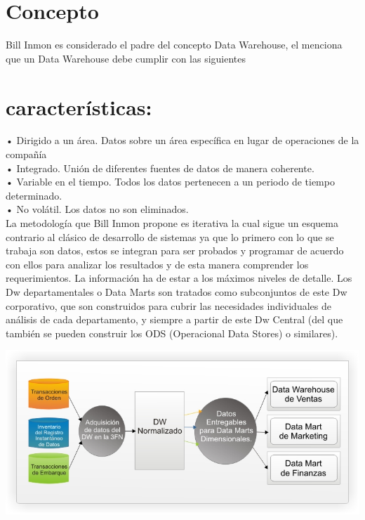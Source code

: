 \section{Concepto}
Bill Inmon es considerado el padre del concepto Data Warehouse, el menciona que un Data Warehouse debe cumplir con las siguientes \section{características:}
•	Dirigido a un área. Datos sobre un área específica en lugar de operaciones de la compañía\\
•	Integrado. Unión de diferentes fuentes de datos de manera coherente.\\
•	Variable en el tiempo. Todos los datos pertenecen a un periodo de tiempo determinado.\\
•	No volátil. Los datos no son eliminados.\\
La metodología que Bill Inmon propone es iterativa la cual sigue un esquema contrario al clásico de desarrollo de sistemas ya que lo primero con lo que se trabaja son datos, estos se integran para ser probados y programar de acuerdo con ellos para analizar los resultados y de esta manera comprender los requerimientos. 
La información ha de estar a los máximos niveles de detalle. Los Dw departamentales o Data Marts son tratados como subconjuntos de este Dw corporativo, que son construidos para cubrir las necesidades individuales de análisis de cada departamento, y siempre a partir de este Dw Central (del que también se pueden construir los ODS (Operacional Data Stores) o similares).\\
\begin{center}
\includegraphics[width=16cm]{./Imagenes/image003}
\end{center}
 
